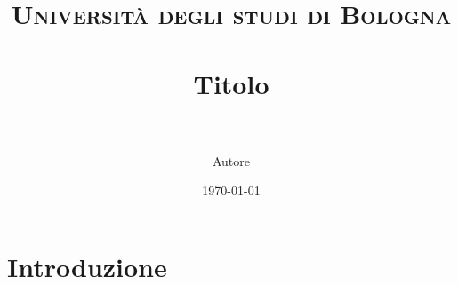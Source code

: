 \documentclass[paper=a4, fontsize=12pt]{scrartcl} %
\title{	
\normalfont \normalsize 
\textsc{Università degli studi di Bologna} \\ [25pt]
\horrule{0.5pt} \\[0.4cm]
\huge Titolo \\
\horrule{2pt} \\[0.5cm]
}
\author{Autore}
\date{\normalsize\today}
\begin{document}
\maketitle


\section{Introduzione}





\nocite{*}

\end{document}
